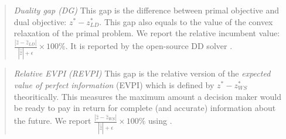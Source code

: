 %

\begin{quote}
\noindent\textit{Duality gap (DG)} This gap is the difference between primal objective and dual objective: $z^*-z^*_{LD}$. This gap also equals to the value of the convex relaxation of the primal problem. We report the relative incumbent value: $\frac{|\hat{z}-\hat{z}_{LD}|}{|\hat{\hat{z}}|+\epsilon}\times 100\%$. It is reported by the open-source DD solver \dsp. 
\end{quote}

\begin{quote}
\noindent\textit{Relative EVPI (REVPI)} This gap is the relative version of the \textit{expected value of perfect information} (EVPI) which is defined by $z^*-z^*_{WS}$ theoritically. This measures the maximum amount a decision maker would be ready to pay in return for complete (and accurate) information about the future. We report $\frac{|\hat{z}-\hat{z}_{WS}|}{|\hat{\hat{z}}|+\epsilon}\times 100\%$ using \cplex.
\end{quote}

